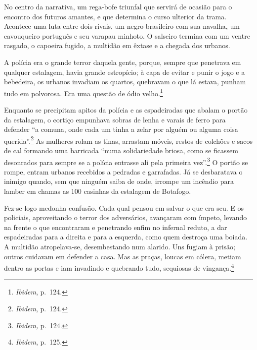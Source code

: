 No centro da narrativa, um rega-bofe triunfal que servirá de ocasião
para o encontro dos futuros amantes, e que determina o curso ulterior da
trama. Acontece uma luta entre dois rivais, um negro brasileiro com sua
navalha, um cavouqueiro português e seu varapau minhoto. O salseiro
termina com um ventre rasgado, o capoeira fugido, a multidão em êxtase e
a chegada dos urbanos.

A polícia era o grande terror daquela gente, porque, sempre que
penetrava em qualquer estalagem, havia grande estropício; à capa de
evitar e punir o jogo e a bebedeira, os urbanos invadiam os quartos,
quebravam o que lá estava, punham tudo em polvorosa. Era uma questão de
ódio velho.\footnote{\emph{Ibidem}, p.~124.}

Enquanto se precipitam apitos da polícia e as espadeiradas que abalam o
portão da estalagem, o cortiço empunhava sobras de lenha e varais de
ferro para defender ``a comuna, onde cada um tinha a zelar por alguém ou
alguma coisa querida''.\footnote{\emph{Ibidem}, p.~124.} As mulheres
rolam as tinas, arrastam móveis, restos de colchões e sacos de cal
formando uma barricada ``numa solidariedade briosa, como se ficassem
desonrados para sempre se a polícia entrasse ali pela primeira
vez''.\footnote{\emph{Ibidem,} p.~124.} O portão se rompe, entram
urbanos recebidos a pedradas e garrafadas. Já se desbaratava o inimigo
quando, sem que ninguém saiba de onde, irrompe um incêndio para lamber
em chamas as 100 casinhas da estalagem de Botafogo.

Fez-se logo medonha confusão. Cada qual pensou em salvar o que era seu.
E os policiais, aproveitando o terror dos adversários, avançaram com
ímpeto, levando na frente o que encontraram e penetrando enfim no
infernal reduto, a dar espadeiradas para a direita e para a esquerda,
como quem destroça uma boiada. A multidão atropelava-se, desembestando
num alarido. Uns fugiam à prisão; outros cuidavam em defender a casa.
Mas as praças, loucas em cólera, metiam dentro as portas e iam invadindo
e quebrando tudo, sequiosas de vingança.\footnote{\emph{Ibidem}, p.~125.}


